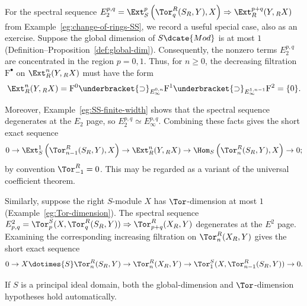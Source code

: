 \begin{example}\label{eg:change-of-rings-SS-bis}
	For the spectral sequence
	$E_2^{p,q}=\Ext_S^p\left(\Tor^R_q(S_R,Y),X\right)
	\Rightarrow\Ext_R^{p+q}(Y,{}_RX)$ from
	Example~\ref{eg:change-of-rings-SS}, we record a useful special case, also
	as an exercise. Suppose the global dimension of $S\dcate{Mod}$ is at most
	$1$ (Definition--Proposition~\ref{def:global-dim}). Consequently, the
	nonzero terms $E_2^{p,q}$ are concentrated in the region $p=0,1$. Thus, for
	$n\geq0$, the decreasing filtration $\mathrm{F}^\bullet$ on
	$\Ext_R^n(Y,{}_RX)$ must have the form
	\[ \Ext_R^n(Y, {}_R X) = \mathrm{F}^0 \underbracket{\supset}_{E_\infty^{0, n}} \mathrm{F}^1 \underbracket{\supset}_{E_\infty^{1, n-1}} \mathrm{F}^2 = \{0\}. \]

	Moreover, Example~\ref{eg:SS-finite-width} shows that the spectral sequence
	degenerates at the $E_2$ page, so
	$E_2^{p,q}\simeq E_\infty^{p,q}$. Combining these facts gives the short
	exact sequence
	\[ 0 \to \Ext_S^1\left( \Tor^R_{n-1}(S_R, Y), X \right) \to \Ext_R^n(Y, {}_R X) \to \Hom_S\left( \Tor^R_n(S_R, Y), X \right) \to 0; \]
	by convention $\Tor^R_{-1}=0$. This may be regarded as a variant of the
	universal coefficient theorem.

	Similarly, suppose the right $S$-module $X$ has $\Tor$-dimension at most
	$1$ (Example~\ref{eg:Tor-dimension}). The spectral sequence
	$E^2_{p,q}=\Tor^S_p(X,\Tor^R_q(S_R,Y))
	\Rightarrow\Tor^R_{p+q}(X_R,Y)$ degenerates at the $E^2$ page. Examining
	the corresponding increasing filtration on $\Tor^R_n(X_R,Y)$ gives the
	short exact sequence
	\[ 0 \to X \dotimes{S} \Tor^R_n(S_R, Y) \to \Tor^R_n(X_R, Y) \to \Tor^S_1(X, \Tor^R_{n-1}(S_R, Y)) \to 0. \]

	If $S$ is a principal ideal domain, both the global-dimension and
	$\Tor$-dimension hypotheses hold automatically.
\end{example}
